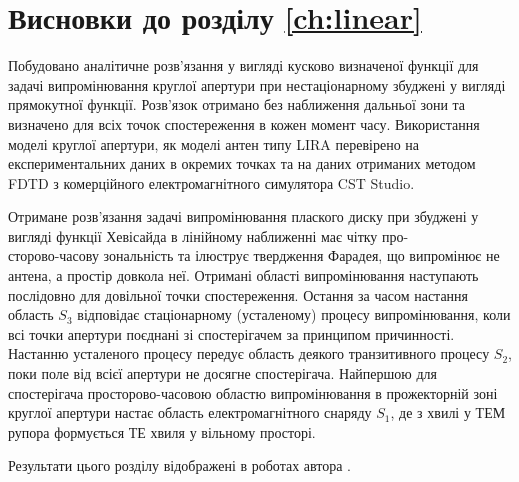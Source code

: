 \section*{Висновки до розділу \ref{ch:linear}}

Побудовано аналітичне розв'язання у вигляді кусково визначеної функції для 
задачі випромінювання круглої апертури при нестаціонарному збуджені у 
вигляді прямокутної функції. Розв'язок отримано без наближення дальньої 
зони та визначено для всіх точок спостереження в кожен момент часу. 
Використання моделі круглої апертури, як моделі антен типу LIRA перевірено 
на експериментальних даних в окремих точках та на даних отриманих методом 
FDTD з комерційного електромагнітного симулятора CST Studio.

Отримане розв'язання задачі випромінювання плаского диску при збуджені у 
вигляді функції Хевісайда в лінійному наближенні має чітку про-\\
сторово-часову 
зональність та ілюструє твердження Фарадея, що випромінює не антена, а 
простір довкола неї. Отримані області випромінювання наступають послідовно 
для довільної точки спостереження. Остання за часом настання область $ S_3 $ 
відповідає стаціонарному (усталеному) процесу випромінювання, коли всі точки 
апертури поєднані зі спостерігачем за принципом причинності. Настанню 
усталеного процесу передує область деякого транзитивного процесу $ S_2 $, 
поки поле від всієї апертури не досягне спостерігача. Найпершою для 
спостерігача просторово-часовою областю випромінювання в прожекторній зоні 
круглої апертури настає область електромагнітного снаряду $ S_1 $, де з 
хвилі у ТЕМ рупора формується ТЕ хвиля у вільному просторі.




Результати цього розділу відображені в роботах автора 
\cite{my:Telecom2018, my:UKRCON2017, my:UWBUSIS2018, my:UKRCON2019}.
